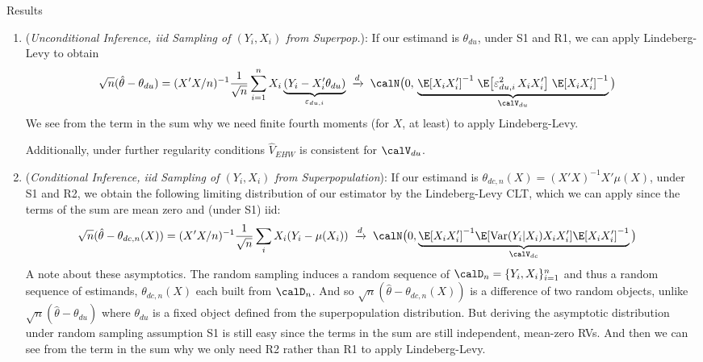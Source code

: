 \documentclass[12pt]{article}
\theoremstyle{plain}
\theoremstyle{definition}
\theoremstyle{remark}
\newcommand{\Var}{\operatorname{Var}}
\newcommand{\dto}{\xrightarrow{d}}
\newcommand{\sumin}{\sum^n_{i=1}}
\begin{document}
Results
\begin{enumerate}
  \item
    (\emph{Unconditional Inference, iid Sampling of $(Y_i,X_i)$ from
    Superpop.}):
    If our estimand is $\theta_{du}$, under S1 and R1, we can apply
    Lindeberg-Levy to obtain
    \begin{align*}
      \sqrt{n}(\hat{\theta}-\theta_{du})
      =
      (X'X/n)^{-1}
      \frac{1}{\sqrt{n}}
      \sumin
      X_i
      \underbrace{%
        (Y_i-X_i'\theta_{du})
      }_{\varepsilon_{du,i}}
      &
      \; \dto\;
      \calN\big(
        0,\,
        \underbrace{%
        \E[X_iX_i']^{-1}
        \;
        \E\big[\varepsilon^2_{du,i}\,X_iX_i'\big]
        \;
        \E[X_iX_i']^{-1}
        }_{\calV_{du}}
      \big)
    \end{align*}
    We see from the term in the sum why we need finite fourth moments
    (for $X$, at least) to apply Lindeberg-Levy.

    Additionally, under further regularity conditions $\hat{V}_{EHW}$ is
    consistent for $\calV_{du}$.

  \item
    (\emph{Conditional Inference, iid Sampling of $(Y_i,X_i)$ from
    Superpopulation}):
    If our estimand is $\theta_{dc,n}(X)=(X'X)^{-1}X'\mu(X)$,
    under S1 and R2, we obtain the following limiting distribution of our
    estimator by the Lindeberg-Levy CLT, which we can apply since the
    terms of the sum are mean zero and (under S1) iid:
    \begin{align*}
      \sqrt{n}(\hat{\theta}-\theta_{dc,n}(X))
      &=
      (X'X/n)^{-1}
      \frac{1}{\sqrt{n}}
      \sum_i
      X_i
        (Y_i-\mu(X_i))
      \; \dto\;
      \calN\big(
        0,
        \underbrace{%
        \E[X_iX_i']^{-1}
        \E[\Var(Y_i|X_i)X_iX_i']
        \E[X_iX_i']^{-1}
        }_{\calV_{dc}}
      \big)
    \end{align*}
    A note about these asymptotics.
    The random sampling induces a random sequence of
    $\calD_n=\{Y_i,X_i\}_{i=1}^n$ and thus a random sequence of
    estimands, $\theta_{dc,n}(X)$ each built from $\calD_n$.
    And so $\sqrt{n}(\hat{\theta}-\theta_{dc,n}(X))$ is a difference of two
    random objects, unlike $\sqrt{n}(\hat{\theta}-\theta_{du})$ where
    $\theta_{du}$ is a fixed object defined from the superpopulation
    distribution.
    But deriving the asymptotic distribution under random sampling
    assumption S1 is still easy since the terms in the sum are still
    independent, mean-zero RVs.
    And then we can see from the term in the sum why we only need R2
    rather than R1 to apply Lindeberg-Levy.


\end{enumerate}
\end{document}
